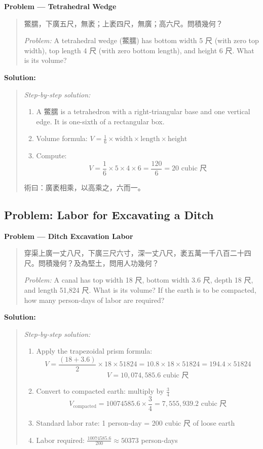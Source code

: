 \documentclass[11pt,a4paper]{article}
\newcommand{\zh}[1]{{#1}}
\newenvironment{chproblem}[1][]{%
  \par\medskip\noindent\textbf{\textcolor{sectioncolor}{#1}}\par\nopagebreak
  \begin{quote}\small
}{%
  \end{quote}\medskip
}
\newenvironment{chsolution}{%
  \par\medskip\noindent\textbf{\textcolor{notecolor}{Solution:}}\par\nopagebreak
  \begin{quote}\small
}{%
  \end{quote}\medskip
}
\newenvironment{stepbystep}{%
  \par\smallskip\noindent\textit{Step-by-step solution:}\par\nopagebreak
  \begin{enumerate}[leftmargin=2em,label=\textbf{Step \arabic*:},ref=\arabic*]
}{%
  \end{enumerate}\medskip
}
\begin{document}
\begin{chproblem}[Problem --- Tetrahedral Wedge]
\zh{鱉臑，下廣五尺，無袤；上袤四尺，無廣；高六尺。問積幾何？}

\medskip
\textit{Problem:} A tetrahedral wedge (\zh{鱉臑}) has bottom width 5 \zh{尺}
(with zero top width), top length 4 \zh{尺} (with zero bottom length), and
height 6 \zh{尺}. What is its volume?
\end{chproblem}

\begin{chsolution}
\begin{stepbystep}
\item A \zh{鱉臑} is a tetrahedron with a right-triangular base and one
vertical edge. It is one-sixth of a rectangular box.

\item Volume formula: $V = \frac{1}{6} \times \text{width} \times \text{length} \times \text{height}$

\item Compute:
\[
V = \frac{1}{6} \times 5 \times 4 \times 6 = \frac{120}{6} = 20 \text{ cubic \zh{尺}}
\]
\end{stepbystep}

\zh{術曰：廣袤相乘，以高乘之，六而一。}
\end{chsolution}

\subsection{Problem: Labor for Excavating a Ditch}

\begin{chproblem}[Problem --- Ditch Excavation Labor]
\zh{穿渠上廣一丈八尺，下廣三尺六寸，深一丈八尺，袤五萬一千八百二十四尺。問積幾何？及為堅土，問用人功幾何？}

\medskip
\textit{Problem:} A canal has top width 18 \zh{尺}, bottom width 3.6 \zh{尺},
depth 18 \zh{尺}, and length 51,824 \zh{尺}. What is its volume? If the earth
is to be compacted, how many person-days of labor are required?
\end{chproblem}

\begin{chsolution}
\begin{stepbystep}
\item Apply the trapezoidal prism formula:
\[
V = \frac{(18 + 3.6)}{2} \times 18 \times 51824 = 10.8 \times 18 \times 51824 = 194.4 \times 51824
\]
\[
V = 10,074,585.6 \text{ cubic \zh{尺}}
\]

\item Convert to compacted earth: multiply by $\frac{3}{4}$
\[
V_{\text{compacted}} = 10074585.6 \times \frac{3}{4} = 7,555,939.2 \text{ cubic \zh{尺}}
\]

\item Standard labor rate: 1 person-day = 200 cubic \zh{尺} of loose earth
\item Labor required: $\frac{10074585.6}{200} \approx 50373$ person-days
\end{stepbystep}
\end{chsolution}
\end{document}
